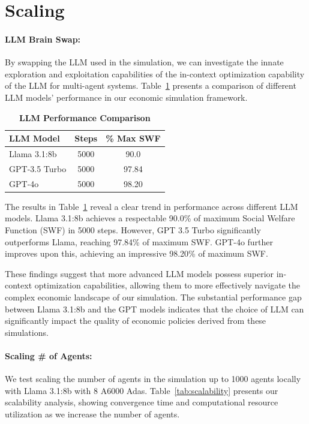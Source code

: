 \section{Scaling}

\paragraph{LLM Brain Swap:} By swapping the LLM used in the simulation, we can investigate the innate exploration and exploitation capabilities of the in-context optimization capability of the LLM for multi-agent systems. Table~\ref{tab:scale} presents a comparison of different LLM models' performance in our economic simulation framework.

\begin{table}[h]
\centering
\caption{\textbf{LLM Performance Comparison}}
\label{tab:scale}
\begin{tabular}{lcc}
\toprule[1.5pt]
\textbf{LLM Model} & \textbf{Steps} & \textbf{\% Max SWF} \\
\midrule[1pt]
Llama 3.1:8b & 5000 & 90.0\\
GPT-3.5 Turbo & 5000 & 97.84 \\
GPT-4o & 5000 & 98.20 \\
\bottomrule[1.5pt]
\end{tabular}
\end{table}

The results in Table~\ref{tab:scale} reveal a clear trend in performance across different LLM models. Llama 3.1:8b achieves a respectable 90.0\% of maximum Social Welfare Function (SWF) in 5000 steps. However, GPT 3.5 Turbo significantly outperforms Llama, reaching 97.84\% of maximum SWF. GPT-4o further improves upon this, achieving an impressive 98.20\% of maximum SWF.

These findings suggest that more advanced LLM models possess superior in-context optimization capabilities, allowing them to more effectively navigate the complex economic landscape of our simulation. The substantial performance gap between Llama 3.1:8b and the GPT models indicates that the choice of LLM can significantly impact the quality of economic policies derived from these simulations.

\paragraph{Scaling \# of Agents:} We test scaling the number of agents in the simulation up to 1000 agents locally with Llama 3.1:8b with 8 A6000 Adas. Table~\ref{tab:scalability} presents our scalability analysis, showing convergence time and computational resource utilization as we increase the number of agents.

